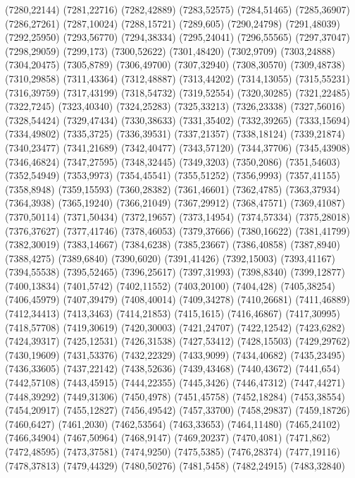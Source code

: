 (7280,22144)
(7281,22716)
(7282,42889)
(7283,52575)
(7284,51465)
(7285,36907)
(7286,27261)
(7287,10024)
(7288,15721)
(7289,605)
(7290,24798)
(7291,48039)
(7292,25950)
(7293,56770)
(7294,38334)
(7295,24041)
(7296,55565)
(7297,37047)
(7298,29059)
(7299,173)
(7300,52622)
(7301,48420)
(7302,9709)
(7303,24888)
(7304,20475)
(7305,8789)
(7306,49700)
(7307,32940)
(7308,30570)
(7309,48738)
(7310,29858)
(7311,43364)
(7312,48887)
(7313,44202)
(7314,13055)
(7315,55231)
(7316,39759)
(7317,43199)
(7318,54732)
(7319,52554)
(7320,30285)
(7321,22485)
(7322,7245)
(7323,40340)
(7324,25283)
(7325,33213)
(7326,23338)
(7327,56016)
(7328,54424)
(7329,47434)
(7330,38633)
(7331,35402)
(7332,39265)
(7333,15694)
(7334,49802)
(7335,3725)
(7336,39531)
(7337,21357)
(7338,18124)
(7339,21874)
(7340,23477)
(7341,21689)
(7342,40477)
(7343,57120)
(7344,37706)
(7345,43908)
(7346,46824)
(7347,27595)
(7348,32445)
(7349,3203)
(7350,2086)
(7351,54603)
(7352,54949)
(7353,9973)
(7354,45541)
(7355,51252)
(7356,9993)
(7357,41155)
(7358,8948)
(7359,15593)
(7360,28382)
(7361,46601)
(7362,4785)
(7363,37934)
(7364,3938)
(7365,19240)
(7366,21049)
(7367,29912)
(7368,47571)
(7369,41087)
(7370,50114)
(7371,50434)
(7372,19657)
(7373,14954)
(7374,57334)
(7375,28018)
(7376,37627)
(7377,41746)
(7378,46053)
(7379,37666)
(7380,16622)
(7381,41799)
(7382,30019)
(7383,14667)
(7384,6238)
(7385,23667)
(7386,40858)
(7387,8940)
(7388,4275)
(7389,6840)
(7390,6020)
(7391,41426)
(7392,15003)
(7393,41167)
(7394,55538)
(7395,52465)
(7396,25617)
(7397,31993)
(7398,8340)
(7399,12877)
(7400,13834)
(7401,5742)
(7402,11552)
(7403,20100)
(7404,428)
(7405,38254)
(7406,45979)
(7407,39479)
(7408,40014)
(7409,34278)
(7410,26681)
(7411,46889)
(7412,34413)
(7413,3463)
(7414,21853)
(7415,1615)
(7416,46867)
(7417,30995)
(7418,57708)
(7419,30619)
(7420,30003)
(7421,24707)
(7422,12542)
(7423,6282)
(7424,39317)
(7425,12531)
(7426,31538)
(7427,53412)
(7428,15503)
(7429,29762)
(7430,19609)
(7431,53376)
(7432,22329)
(7433,9099)
(7434,40682)
(7435,23495)
(7436,33605)
(7437,22142)
(7438,52636)
(7439,43468)
(7440,43672)
(7441,654)
(7442,57108)
(7443,45915)
(7444,22355)
(7445,3426)
(7446,47312)
(7447,44271)
(7448,39292)
(7449,31306)
(7450,4978)
(7451,45758)
(7452,18284)
(7453,38554)
(7454,20917)
(7455,12827)
(7456,49542)
(7457,33700)
(7458,29837)
(7459,18726)
(7460,6427)
(7461,2030)
(7462,53564)
(7463,33653)
(7464,11480)
(7465,24102)
(7466,34904)
(7467,50964)
(7468,9147)
(7469,20237)
(7470,4081)
(7471,862)
(7472,48595)
(7473,37581)
(7474,9250)
(7475,5385)
(7476,28374)
(7477,19116)
(7478,37813)
(7479,44329)
(7480,50276)
(7481,5458)
(7482,24915)
(7483,32840)
